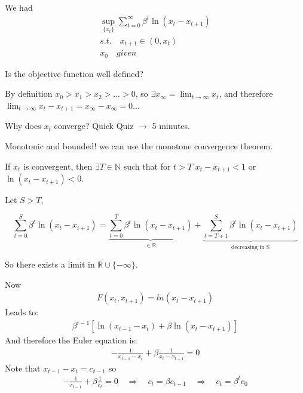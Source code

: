 \documentclass[aspectratio=169]{beamer}
\begin{document}
\begin{frame}
    We had
    \begin{align*}
      \sup_{\{x_t\}} \sum_{t=0}^\infty \beta^t \ln(x_t-x_{t+1})\\
      s.t.\quad x_{t+1}\in(0,x_{t})\\
      x_0\quad given
    \end{align*}
\end{frame}

\begin{frame}
    Is the objective function well defined?
    
    \vspace{0.5cm}
    
    \pause
    
    By definition $x_0>x_1>x_2>... > 0$, so $\exists x_\infty = \lim_{t\rightarrow\infty} x_t$, and therefore $\lim_{t\rightarrow\infty} x_t - x_{t+1} = x_\infty - x_\infty = 0$...
    
    \vspace{0.5cm}
    
    Why does $x_t$ converge? Quick Quiz $\rightarrow$ 5 minutes. \pause
    
    \vspace{0.5cm}
    
    Monotonic and bounded! we can use the monotone convergence theorem.
    
\end{frame}

\begin{frame}
    If $x_t$ is convergent, then $\exists T\in\mathds{N}$ such that for $t>T$ $x_t-x_{t+1} < 1$ or $\ln(x_t-x_{t+1}) < 0$.
    
    Let $S>T$,
    
    $$\sum_{t=0}^S \beta^t \ln(x_t-x_{t+1}) = \underbrace{\sum_{t=0}^T \beta^t \ln(x_t-x_{t+1})}_{\in\mathds{R}} + \underbrace{\sum_{t=T+1}^S \beta^t \ln(x_t-x_{t+1})}_{\text{decreasing in S}}$$
    
    So there exists a limit in $\mathds{R}\cup\{-\infty\}$.
    
\end{frame}

\begin{frame}
    Now
    \begin{align*}
        F(x_t,x_{t+1}) = ln(x_t-x_{t+1})
    \end{align*}
    Leads to:
    \begin{align*}
        \beta^{t-1}[\ln(x_{t-1}-x_t)+\beta\ln(x_t-x_{t+1})]
    \end{align*}
    And therefore the Euler equation is:
    \begin{align*}
        -\frac{1}{x_{t-1}-x_t}+\beta\frac{1}{x_t-x_{t+1}} = 0
    \end{align*}
    Note that $x_{t-1}-x_t = c_{t-1}$ so
    \begin{align*}
        -\frac{1}{c_{t-1}}+\beta\frac{1}{c_t} = 0 \quad\Rightarrow\quad c_t = \beta c_{t-1}\quad\Rightarrow\quad c_t = \beta^t c_0
    \end{align*}
\end{frame}
\end{document}
